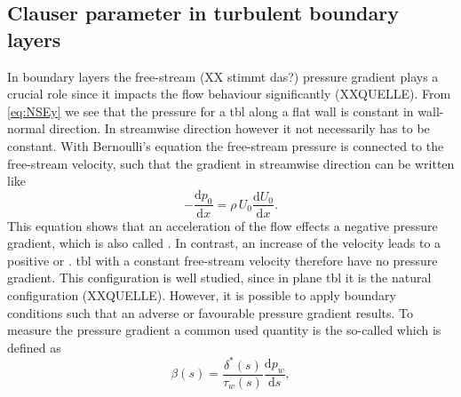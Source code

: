 

\subsection{Clauser parameter in turbulent boundary layers}

In boundary layers the free-stream (XX stimmt das?) pressure gradient plays a crucial role since it impacts the flow behaviour significantly (XXQUELLE).
From \autoref{eq:NSEy} we see that the pressure for a \acrshort{tbl} along a flat wall is constant in wall-normal direction.
In streamwise direction however it not necessarily has to be constant.
With Bernoulli's equation the free-stream pressure is connected to the free-stream velocity, such that the gradient in streamwise direction can be written like
\begin{equation}\label{eq:bernoulli}
    -\frac{\mathrm{d}p_0}{\mathrm{d}x} = \rho\, U_0 \frac{\mathrm{d}U_0}{\mathrm{d}x}.
\end{equation}
This equation shows that an acceleration of the flow effects a negative pressure gradient, which is also called . 
In contrast, an increase of the velocity leads to a positive or . 
\acrshort{tbl} with a constant free-stream velocity therefore have no pressure gradient.
This  configuration is well studied, since in plane \acrshort{tbl} it is the natural configuration (XXQUELLE).
However, it is possible to apply boundary conditions such that an adverse or favourable pressure gradient results.
To measure the pressure gradient a common used quantity is the so-called  which is defined as
\begin{equation}\label{eq:beta}
    \beta(s) = \frac{\delta^*(s)}{\tau_w(s)} \frac{\mathrm{d}p_w}{\mathrm{d}s},
\end{equation}

